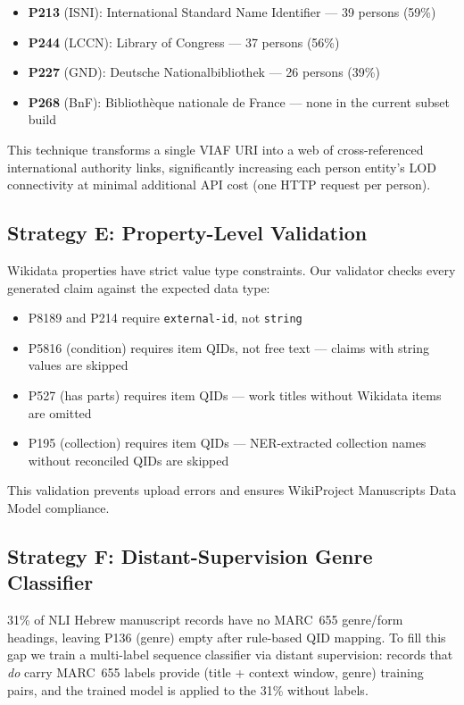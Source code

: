 \documentclass[Afour,sageh,times]{sagej}
\begin{document}
\begin{itemize}[leftmargin=*]
\item \textbf{P213} (ISNI): International Standard Name Identifier --- 39 persons (59\%)
\item \textbf{P244} (LCCN): Library of Congress --- 37 persons (56\%)
\item \textbf{P227} (GND): Deutsche Nationalbibliothek --- 26 persons (39\%)
\item \textbf{P268} (BnF): Biblioth\`{e}que nationale de France --- none in the current subset build
\end{itemize}

This technique transforms a single VIAF URI into a web of cross-referenced international authority links, significantly increasing each person entity's LOD connectivity at minimal additional API cost (one HTTP request per person).

\subsection{Strategy E: Property-Level Validation}

Wikidata properties have strict value type constraints. Our validator checks every generated claim against the expected data type:
\begin{itemize}[leftmargin=*]
\item P8189 and P214 require \texttt{external-id}, not \texttt{string}
\item P5816 (condition) requires item QIDs, not free text --- claims with string values are skipped
\item P527 (has parts) requires item QIDs --- work titles without Wikidata items are omitted
\item P195 (collection) requires item QIDs --- NER-extracted collection names without reconciled QIDs are skipped
\end{itemize}

This validation prevents upload errors and ensures WikiProject Manuscripts Data Model compliance.

\subsection{Strategy F: Distant-Supervision Genre Classifier}

31\% of NLI Hebrew manuscript records have no MARC~655 genre/form headings, leaving P136 (genre) empty after rule-based QID mapping. To fill this gap we train a multi-label sequence classifier via distant supervision: records that \emph{do} carry MARC~655 labels provide (title + context window, genre) training pairs, and the trained model is applied to the 31\% without labels.
\end{document}
